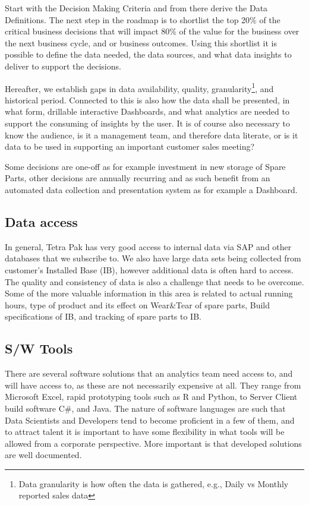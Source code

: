 \documentclass[10pt]{article} %
\begin{document}
Start with the Decision Making Criteria and from there derive the Data Definitions. The next step in the roadmap is to shortlist the top 20\% of the critical business decisions that will impact 80\% of the value for the business over the next business cycle, and or business outcomes. Using this shortlist it is possible to define the data needed, the data sources, and what data insights to deliver to support the decisions.

Hereafter, we establish gaps in data availability, quality, granularity\footnote{Data granularity is how often the data is gathered, e.g., Daily vs Monthly reported sales data}, and historical period. Connected to this is also how the data shall be presented, in what form, drillable interactive Dashboards, and what analytics are needed to support the consuming of insights by the user. It is of course also necessary to know the audience, is it a management team, and therefore data literate, or is it data to be used in supporting an important customer sales meeting?

Some decisions are one-off as for example investment in new storage of Spare Parts, other decisions are annually recurring and as such benefit from an automated data collection and presentation system as for example a Dashboard.

\subsection{Data access}

In general, Tetra Pak has very good access to internal data via SAP and other databases that we subscribe to. We also have large data sets being collected from customer's Installed Base (IB), however additional data is often hard to access. The quality and consistency of data is also a challenge that needs to be overcome. Some of the more valuable information in this area is related to actual running hours, type of product and its effect on Wear\&Tear of spare parts, Build specifications of IB, and tracking of spare parts to IB.

\subsection{S/W Tools}

There are several software solutions that an analytics team need access to, and will have access to, as these are not necessarily expensive at all. They range from Microsoft Excel, rapid prototyping tools such as R and Python, to Server Client build software C\#, and Java. The nature of software languages are such that Data Scientists and Developers tend to become proficient in a few of them, and to attract talent it is important to have some flexibility in what tools will be allowed from a corporate perspective. More important is that developed solutions are well documented.
\end{document}
